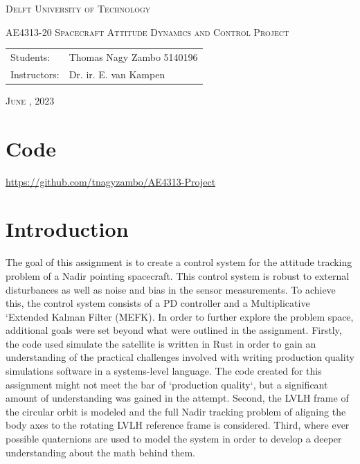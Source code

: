 \documentclass{article}
\begin{document}
\begin{titlepage}
	\centering
	\vspace{5cm}
	{\scshape\Huge Delft University of Technology \par}
	\vspace{1.5cm}
	{\scshape\Large AE4313-20 Spacecraft Attitude Dynamics and Control Project\par}
    
	\vspace{\fill}
	\flushleft
	{\scshape\large\begin{tabular}{@{}ll}
	    Students:       & Thomas Nagy Zambo 5140196 \\
	    Instructors:    & Dr. ir. E. van Kampen \\
	\end{tabular}\par}
	\vspace{0.5cm}
    
                        
    {\scshape\large June , 2023\par}
\end{titlepage}




\tableofcontents
\listoffigures
\section*{Code}
\url{https://github.com/tnagyzambo/AE4313-Project}

\newpage
{}
\setcounter{page}{1}

\section{Introduction}

The goal of this assignment is to create a control system for the attitude tracking problem of a Nadir pointing spacecraft. This control system is robust to external disturbances as well as noise and bias in the sensor measurements. To achieve this, the control system consists of a PD controller and a Multiplicative `Extended Kalman Filter (MEFK). In order to further explore the problem space, additional goals were set beyond what were outlined in the assignment. Firstly, the code used simulate the satellite is written in Rust in order to gain an understanding of the practical challenges involved with writing production quality simulations software in a systems-level language. The code created for this assignment might not meet the bar of `production quality`, but a significant amount of understanding was gained in the attempt. Second, the LVLH frame of the circular orbit is modeled and the full Nadir tracking problem of aligning the body axes to the rotating LVLH reference frame is considered. Third, where ever possible quaternions are used to model the system in order to develop a deeper understanding about the math behind them.
\end{document}
